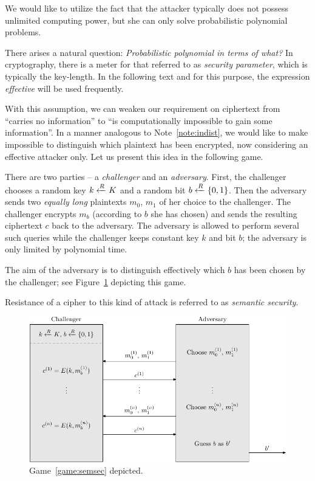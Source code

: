 We would like to utilize the fact that the attacker typically does not possess unlimited computing power, but she can only solve probabilistic polynomial problems.

\begin{note}
\label{note:polyinterms}
	There arises a natural question: {\em Probabilistic polynomial in terms of what?} In cryptography, there is a meter for that referred to as {\em security parameter}, which is typically the key-length. In the following text and for this purpose, the expression {\em effective} will be used frequently.
\end{note}

With this assumption, we can weaken our requirement on ciphertext from ``carries no information'' to ``is computationally impossible to gain some information''. In a manner analogous to Note~\ref{note:indist}, we would like to make impossible to distinguish which plaintext has been encrypted, now considering an effective attacker only. Let us present this idea in the following game.

\begin{game}
\label{game:semsec}
	There are two parties -- a {\em challenger} and an {\em adversary}. First, the challenger chooses a random key $k\xleftarrow{R} K$ and a random bit $b\xleftarrow{R}\{0,1\}$. Then the adversary sends two {\em equally long} plaintexts $m_0$, $m_1$ of her choice to the challenger. The challenger encrypts $m_b$ (according to $b$ she has chosen) and sends the resulting ciphertext $c$ back to the adversary. The adversary is allowed to perform several such queries while the challenger keeps constant key $k$ and bit $b$; the adversary is only limited by polynomial time.
	
	The aim of the adversary is to distinguish effectively which $b$ has been chosen by the challenger; see Figure~\ref{fig:semsecgame} depicting this game.
\end{game}

\begin{note}
\label{note:semsec}
	Resistance of a cipher to this kind of attack is referred to as {\em semantic security}.
\end{note}

\begin{figure}[H]
\begin{center}
	\includegraphics{./figures/game_semsec/game_semsec-1.pdf}
	\caption{Game~\ref{game:semsec} depicted.}
	\label{fig:semsecgame}
\end{center}
\end{figure}

